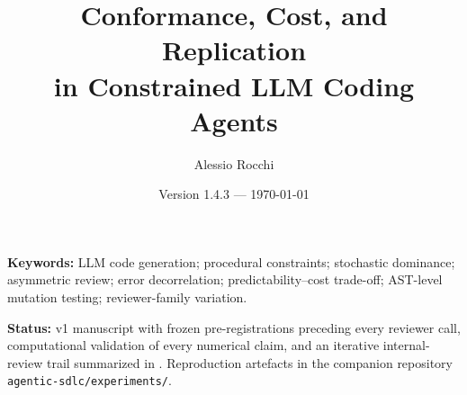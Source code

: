 \documentclass[11pt,a4paper]{article}
\title{Conformance, Cost, and Replication \\
in Constrained LLM Coding Agents}
\author[1]{Alessio Rocchi}
\affil[1]{AIGEN Solutions}
\date{Version 1.4.3 --- \today}
\theoremstyle{definition}
\theoremstyle{plain}
\begin{document}
\maketitle

\begin{abstract}

\end{abstract}

\noindent\textbf{Keywords:} LLM code generation; procedural constraints; stochastic dominance; asymmetric review; error decorrelation; predictability--cost trade-off; AST-level mutation testing; reviewer-family variation.

\vspace{0.5em}

\noindent\textbf{Status:} v1 manuscript with frozen pre-registrations preceding every reviewer call, computational validation of every numerical claim, and an iterative internal-review trail summarized in . Reproduction artefacts in the companion repository \texttt{agentic-sdlc/experiments/}.

\tableofcontents

\clearpage











\appendix




\end{document}
